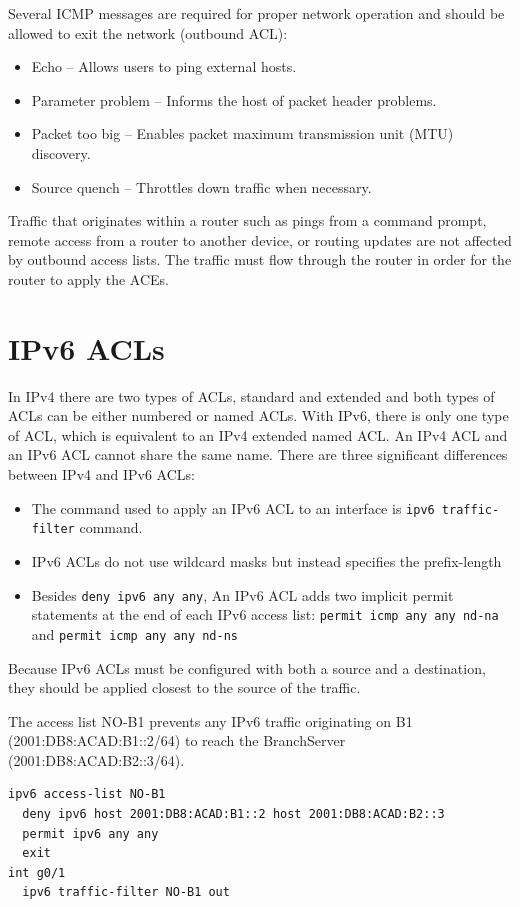 Several ICMP messages are required for proper network operation and should be allowed to exit the network (outbound ACL):

\begin{itemize}
\item Echo -- Allows users to ping external hosts.
\item Parameter problem -- Informs the host of packet header problems.
\item Packet too big -- Enables packet maximum transmission unit (MTU) discovery.
\item Source quench -- Throttles down traffic when necessary.
\end{itemize}

\note Traffic that originates within a router such as pings from a command prompt, remote access from a router to another device, or routing updates are not affected by outbound access lists. The traffic must flow through the router in order for the router to apply the ACEs.

\section{IPv6 ACLs}

In IPv4 there are two types of ACLs, standard and extended and both types of ACLs can be either numbered or named ACLs. With IPv6, there is only one type of ACL, which is equivalent to an IPv4 extended named ACL. An IPv4 ACL and an IPv6 ACL cannot share the same name. There are three significant differences between IPv4 and IPv6 ACLs:

\begin{itemize}
\item The command used to apply an IPv6 ACL to an interface is \texttt{ipv6 traffic-filter} command.
\item IPv6 ACLs do not use wildcard masks but instead specifies the prefix-length
\item Besides \texttt{deny ipv6 any any}, An IPv6 ACL adds two implicit permit statements at the end of each IPv6 access list: \texttt{permit icmp any any nd-na} and \texttt{permit icmp any any nd-ns}
\end{itemize}
	
Because IPv6 ACLs must be configured with both a source and a destination, they should be applied closest to the source of the traffic.

\begin{example}
The access list NO-B1 prevents any IPv6 traffic originating on B1 (2001:DB8:ACAD:B1::2/64) to reach the BranchServer (2001:DB8:ACAD:B2::3/64).
\begin{verbatim}
ipv6 access-list NO-B1
  deny ipv6 host 2001:DB8:ACAD:B1::2 host 2001:DB8:ACAD:B2::3
  permit ipv6 any any
  exit
int g0/1
  ipv6 traffic-filter NO-B1 out
\end{verbatim}
\end{example}



